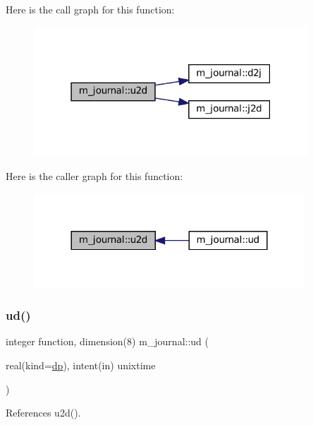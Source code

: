 Here is the call graph for this function\+:\nopagebreak
\begin{figure}[H]
\begin{center}
\leavevmode
\includegraphics[width=291pt]{namespacem__journal_a9521857f9c0a6ef8c85edcf9a3af1b07_cgraph}
\end{center}
\end{figure}
Here is the caller graph for this function\+:\nopagebreak
\begin{figure}[H]
\begin{center}
\leavevmode
\includegraphics[width=288pt]{namespacem__journal_a9521857f9c0a6ef8c85edcf9a3af1b07_icgraph}
\end{center}
\end{figure}
\mbox{\label{namespacem__journal_abfa78dcc463f8fcdffe0b259df2f4c92}} 
\subsubsection{\texorpdfstring{ud()}{ud()}}
{\footnotesize\ttfamily integer function, dimension(8) m\+\_\+journal\+::ud (\begin{DoxyParamCaption}\item[{real(kind=\mbox{\hyperlink{namespacem__journal_aaae0522a70bb76a85ea800670d5fec5f}{dp}}), intent(in)}]{unixtime }\end{DoxyParamCaption})\hspace{0.3cm}{\ttfamily [private]}}



References u2d().

